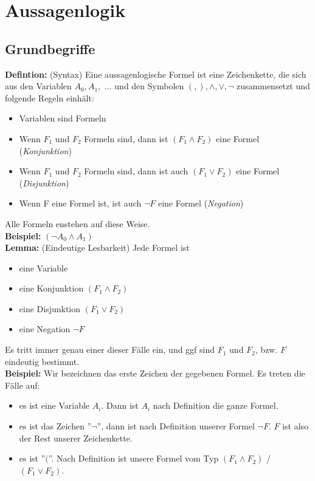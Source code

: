 \documentclass[a4paper]{scrartcl}
\begin{document}
\tableofcontents
\newpage
\section{Aussagenlogik}

\subsection{Grundbegriffe}
\textbf{Defintion:} (Syntax) Eine aussagenlogische Formel ist eine Zeichenkette, die sich aus den Variablen $A_0, A_1,$ ... und den Symbolen $(, ), \wedge, \vee, \neg$ zusammensetzt und folgende Regeln einhält:
\begin{itemize}
\item Variablen sind Formeln 
\item Wenn $F_1$ und $F_2$ Formeln sind, dann ist $(F_1 \wedge F_2)$ eine Formel (\textit{Konjunktion})
\item Wenn $F_1$ und $F_2$ Formeln sind, dann ist auch $(F_1 \vee F_2)$ eine Formel (\textit{Disjunktion})
\item Wenn F eine Formel ist, ist auch $\neg F$ eine Formel (\textit{Negation})
\end{itemize}
Alle Formeln enstehen auf diese Weise.\\
\textbf{Beispiel:} $(\neg A_0 \wedge A_1)$\\
\textbf{Lemma:} (Eindeutige Lesbarkeit) Jede Formel ist
\begin{itemize}
\item eine Variable
\item eine Konjunktion $(F_1 \wedge F_2)$
\item eine Disjunktion $(F_1 \vee F_2)$
\item eine Negation $\neg F$
\end{itemize}
Es tritt immer genau einer dieser Fälle ein, und ggf sind $F_1$ und $F_2$, bzw. $F$ eindeutig bestimmt.\\
\textbf{Beispiel:} Wir bezeichnen das erste Zeichen der gegebenen Formel. Es treten die Fälle auf:
\begin{itemize}
\item es ist eine Variable $A_i$. Dann ist $A_i$ nach Definition die ganze Formel.
\item es ist das Zeichen ''$\neg$'', dann ist nach Definition unserer Formel $\neg F$. $F$ ist also der Rest unserer Zeichenkette.
\item es ist ''$($''. Nach Definition ist unsere Formel vom Typ $(F_1 \wedge F_2)$ / $(F_1 \vee F_2)$.
\end{itemize}
\end{document}
